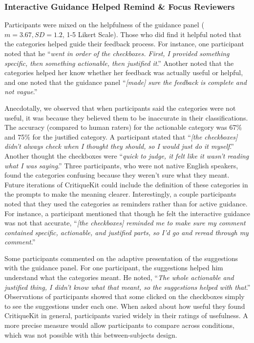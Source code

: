 \subsubsection{Interactive Guidance Helped Remind \& Focus Reviewers} 
Participants were mixed on the helpfulness of the guidance panel ($m = 3.67, SD = 1.2$, 1-5 Likert Scale). Those who did find it helpful noted that the categories helped guide their feedback process. For instance, one participant noted that he ``\textit{went in order of the checkboxes. First, I provided something specific, then something actionable, then justified it}.'' Another noted that the categories helped her know whether her feedback was actually useful or helpful, and one noted that the guidance panel ``\textit{[made] sure the feedback is complete and not vague}.'' 

Anecdotally, we observed that when participants said the categories were not useful, it was because they believed them to be inaccurate in their classifications. The accuracy (compared to human raters) for the actionable category was 67\% and 75\% for the justified category. A participant stated that ``\textit{[the checkboxes] didn't always check when I thought they should, so I would just do it myself}.'' Another thought the checkboxes were ``\textit{quick to judge, it felt like it wasn't reading what I was saying}.'' Three participants, who were not native English speakers, found the categories confusing because they weren't sure what they meant. Future iterations of CritiqueKit could include the definition of these categories in the prompts to make the meaning clearer. Interestingly, a couple participants noted that they used the categories as reminders rather than for active guidance. For instance, a participant mentioned that though he felt the interactive guidance was not that accurate, ``\textit{[the checkboxes] reminded me to make sure my comment contained specific, actionable, and justified parts, so I'd go and reread through my comment}.'' 

Some participants commented on the adaptive presentation of the suggestions with the guidance panel. For one participant, the suggestions helped him understand what the categories meant. He noted, ``\textit{The whole actionable and justified thing, I didn't know what that meant, so the suggestions helped with that}.'' Observations of participants showed that some clicked on the checkboxes simply to see the suggestions under each one. When asked about how useful they found CritiqueKit in general, participants varied widely in their ratings of usefulness. A more precise measure would allow participants to compare across conditions, which was not possible with this between-subjects design. 
